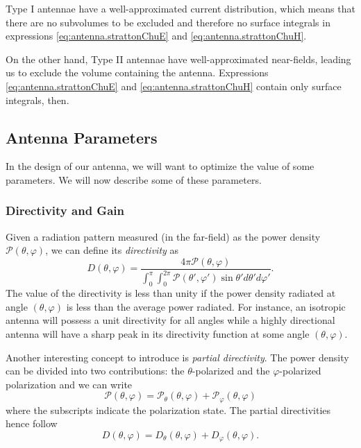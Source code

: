 Type I antennae have a well-approximated current distribution, which means that there are no
subvolumes to be excluded and therefore no surface integrals in expressions 
\eqref{eq:antenna.strattonChuE} and \eqref{eq:antenna.strattonChuH}. 

On the other hand, Type II antennae have well-approximated near-fields, leading
us to exclude the volume containing the antenna. Expressions \eqref{eq:antenna.strattonChuE}
and \eqref{eq:antenna.strattonChuH} contain only surface integrals, then. 

\subsection{Antenna Parameters}
In the design of our antenna, we will want to optimize the value
of some parameters. We will now describe some of these parameters.

\subsubsection[Directivity and Gain]{Directivity and Gain \cite[\S 1.16]{ELL2003}}
Given a radiation pattern measured (in the far-field) as the power density 
$\mathcal{P}(\theta,\varphi)$, we can define its \textit{directivity}
as
  \begin{equation}
   D(\theta,\varphi) = \frac{4\pi\mathcal{P}(\theta,\varphi)}
			{\int_0^\pi\int_0^{2\pi}\mathcal{P}(\theta',\varphi')\sin\theta'd\theta'd\varphi'}.
  \end{equation}
The value of the directivity is less than unity if the power density radiated at angle $(\theta,\varphi)$
is less than the average power radiated. For instance, an isotropic antenna will possess a unit directivity
for all angles while a highly directional antenna will have a sharp peak  in its directivity function 
at some angle $(\theta,\varphi)$.

Another interesting concept to introduce is \textit{partial directivity}. 
The power density can be divided into two contributions: the $\theta$-polarized
and the $\varphi$-polarized polarization and we can write
  \begin{equation}
    \mathcal{P}(\theta,\varphi) = \mathcal{P}_\theta(\theta,\varphi)+\mathcal{P}_\varphi(\theta,\varphi)
  \end{equation}
where the subscripts indicate the polarization state. The partial 
directivities hence follow
  \begin{equation}
   D(\theta,\varphi) = D_\theta(\theta,\varphi)+D_\varphi(\theta,\varphi).
  \end{equation}

